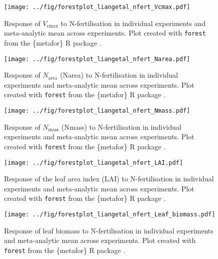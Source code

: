 \documentclass{myreport}
\begin{document}
\begin{figure}[h]
\centering
\texttt{[image: ../fig/forestplot\_liangetal\_nfert\_Vcmax.pdf]}
\caption{Response of $V_\text{cmax}$ to N-fertilisation in individual experiments and meta-analytic mean across experiments. Plot created with \texttt{forest} from the \{metafor\} R package \cite{viechtbauer_conducting_2010}.}
\end{figure}

\begin{figure}[h]
\centering
\texttt{[image: ../fig/forestplot\_liangetal\_nfert\_Narea.pdf]}
\caption{Response of $N_\text{area}$ (Narea) to N-fertilisation in individual experiments and meta-analytic mean across experiments. Plot created with \texttt{forest} from the \{metafor\} R package \cite{viechtbauer_conducting_2010}.}
\end{figure}

\begin{figure}[h]
\centering
\texttt{[image: ../fig/forestplot\_liangetal\_nfert\_Nmass.pdf]}
\caption{Response of $N_\text{mass}$ (Nmass) to N-fertilisation in individual experiments and meta-analytic mean across experiments. Plot created with \texttt{forest} from the \{metafor\} R package \cite{viechtbauer_conducting_2010}.}
\end{figure}


\begin{figure}[h]
\centering
\texttt{[image: ../fig/forestplot\_liangetal\_nfert\_LAI.pdf]}
\caption{Response of the leaf area index (LAI) to N-fertilisation in individual experiments and meta-analytic mean across experiments. Plot created with \texttt{forest} from the \{metafor\} R package \cite{viechtbauer_conducting_2010}.}
\end{figure}

\begin{figure}[h]
\centering
\texttt{[image: ../fig/forestplot\_liangetal\_nfert\_Leaf\_biomass.pdf]}
\caption{Response of leaf biomass to N-fertilisation in individual experiments and meta-analytic mean across experiments. Plot created with \texttt{forest} from the \{metafor\} R package \cite{viechtbauer_conducting_2010}.}
\end{figure}

\clearpage

% 
% 


\clearpage

\end{document}
